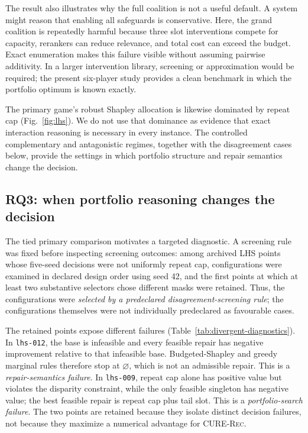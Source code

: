 \documentclass[review]{elsarticle}
\theoremstyle{plain}
\theoremstyle{definition}
\theoremstyle{remark}
\newcommand{\CURE}{\textsc{CURE-Rec}}
\begin{document}
The result also illustrates why the full coalition is not a useful default. A system might reason that enabling all safeguards is conservative. Here, the grand coalition is repeatedly harmful because three slot interventions compete for capacity, rerankers can reduce relevance, and total cost can exceed the budget. Exact enumeration makes this failure visible without assuming pairwise additivity. In a larger intervention library, screening or approximation would be required; the present six-player study provides a clean benchmark in which the portfolio optimum is known exactly.

The primary game's robust Shapley allocation is likewise dominated by repeat cap (Fig.~\ref{fig:lhs}). We do not use that dominance as evidence that exact interaction reasoning is necessary in every instance. The controlled complementary and antagonistic regimes, together with the disagreement cases below, provide the settings in which portfolio structure and repair semantics change the decision.

\subsection{RQ3: when portfolio reasoning changes the decision}\label{sec:divergent-selectors}

The tied primary comparison motivates a targeted diagnostic. A screening rule was fixed before inspecting screening outcomes: among archived LHS points whose five-seed decisions were not uniformly repeat cap, configurations were examined in declared design order using seed 42, and the first points at which at least two substantive selectors chose different masks were retained. Thus, the configurations were \emph{selected by a predeclared disagreement-screening rule}; the configurations themselves were not individually predeclared as favourable cases.

The retained points expose different failures (Table~\ref{tab:divergent-diagnostics}). In \texttt{lhs-012}, the base is infeasible and every feasible repair has negative improvement relative to that infeasible base. Budgeted-Shapley and greedy marginal rules therefore stop at $\varnothing$, which is not an admissible repair. This is a \emph{repair-semantics failure}. In \texttt{lhs-009}, repeat cap alone has positive value but violates the disparity constraint, while the only feasible singleton has negative value; the best feasible repair is repeat cap plus tail slot. This is a \emph{portfolio-search failure}. The two points are retained because they isolate distinct decision failures, not because they maximize a numerical advantage for \CURE{}.
\end{document}
